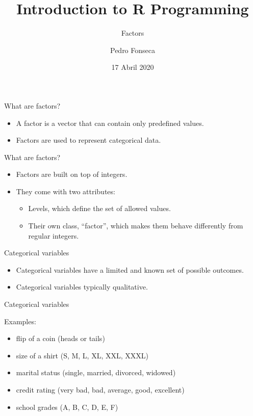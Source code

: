 \documentclass[ignorenonframetext,]{beamer}
\title{Introduction to R Programming}
\subtitle{Factors}
\author{Pedro Fonseca}
\date{17 Abril 2020}
\providecommand{\tightlist}{%
  \setlength{\itemsep}{0pt}\setlength{\parskip}{0pt}}
\begin{document}
\frame{\titlepage}

\begin{frame}{What are factors?}
\protect\hypertarget{what-are-factors}{}

\begin{itemize}
\tightlist
\item
  A factor is a vector that can contain only predefined values.
\item
  Factors are used to represent categorical data.
\end{itemize}

\end{frame}

\begin{frame}{What are factors?}
\protect\hypertarget{what-are-factors-1}{}

\begin{itemize}
\item
  Factors are built on top of integers.
\item
  They come with two attributes:

  \begin{itemize}
  \tightlist
  \item
    Levels, which define the set of allowed values.
  \item
    Their own class, ``factor'', which makes them behave differently
    from regular integers.
  \end{itemize}
\end{itemize}

\end{frame}

\begin{frame}{Categorical variables}
\protect\hypertarget{categorical-variables}{}

\begin{itemize}
\item
  Categorical variables have a limited and known set of possible
  outcomes.
\item
  Categorical variables typically qualitative.
\end{itemize}

\end{frame}

\begin{frame}{Categorical variables}
\protect\hypertarget{categorical-variables-1}{}

Examples:

\begin{itemize}
\tightlist
\item
  flip of a coin (heads or tails)
\item
  size of a shirt (S, M, L, XL, XXL, XXXL)
\item
  marital status (single, married, divorced, widowed)
\item
  credit rating (very bad, bad, average, good, excellent)
\item
  school grades (A, B, C, D, E, F)
\end{itemize}

\end{frame}
\end{document}
